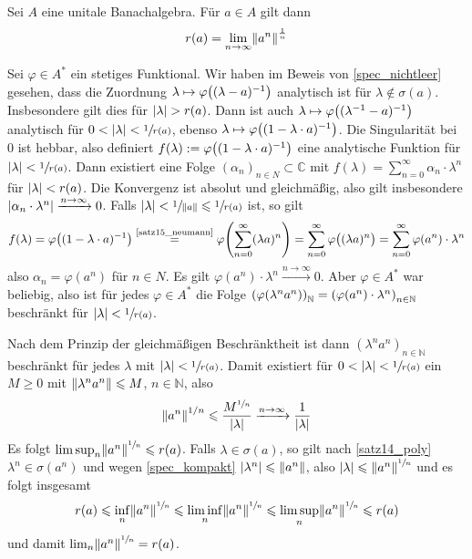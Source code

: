 \begin{satz}
	Sei $A$ eine unitale Banachalgebra. Für $a \in A$ gilt dann 
	\[
		r(a)=\lim_{n \to \infty}\norm{a^n}^{\frac{1}{n}}
	\]
\end{satz}
\begin{beweis}
	Sei $\varphi \in A^*$ ein stetiges Funktional. Wir haben im Beweis von \autoref{spec_nichtleer} gesehen, dass die Zuordnung 
	$\lambda \mapsto \varphi \enbrace*{(\lambda-a)^{-1}}$ analytisch ist für $\lambda \notin \sigma(a)$. Insbesondere gilt dies für $\abs{\lambda}> r(a)$. Dann ist auch
	$\lambda \mapsto \varphi \enbrace*{(\lambda^{-1}-a)^{-1}}$ analytisch für $0< \abs{\lambda}< \sfrac{1}{r(a)}$, ebenso 
	$\lambda \mapsto \varphi \enbrace*{(1- \lambda \cdot a)^{-1}}$. Die Singularität bei $0$ ist hebbar, also definiert $f(\lambda) := \varphi \enbrace*{(1-\lambda \cdot a)^{-1}}$
	eine analytische Funktion für $\abs{\lambda} < \sfrac{1}{r(a)}$. Dann existiert eine Folge $(\alpha_n)_{n \in N} \subset \mathds{C}$ mit 
	$f(\lambda) = \sum_{n=0}^{\infty} \alpha_n \cdot \lambda^n$ für $\abs{\lambda}<r(a)$. Die Konvergenz ist absolut und gleichmäßig, also gilt insbesondere 
	$\abs{\alpha_n \cdot \lambda^n} \xrightarrow{n \to \infty}0$. Falls $\abs{\lambda} < \sfrac{1}{\norm{a}} \le \sfrac{1}{r(a)}$ 
	ist, so gilt
	\[
		f(\lambda) = \varphi \enbrace*{(1- \lambda \cdot a)^{-1}} \stackrel{\mbox{\scriptsize\ref{satz15_neumann}}}{=} \varphi \enbrace*{\sum_{n=0}^{\infty} (\lambda a)^n} = 
		\sum_{n=0}^{\infty} \varphi \enbrace[\big]{(\lambda a)^n} = \sum_{n=0}^{\infty} \varphi(a^n) \cdot \lambda^n
	\]
	also $\alpha_n = \varphi(a^n)$ für $n \in N$. Es gilt $\varphi(a^n) \cdot \lambda^n \xrightarrow{n \to \infty} 0$. Aber $\varphi \in A^*$ war beliebig, also ist für jedes 
	$\varphi \in A^*$ die Folge $\enbrace*{\varphi(\lambda^n a^n)}_\mathds{N} = \enbrace*{\varphi(a^n) \cdot \lambda^n}_{n \in \mathds{N}}$ beschränkt für 
	$\abs{\lambda}<\sfrac{1}{r(a)}$.

	Nach dem Prinzip der gleichmäßigen Beschränktheit ist dann $(\lambda^n a^n)_{n \in \mathds{N}}$ beschränkt für jedes $\lambda$ mit $\abs{\lambda}< \sfrac{1}{r(a)}$. Damit 
	existiert für $0 < \abs{\lambda}< \sfrac{1}{r(a)}$ ein $M \ge 0$ mit $\norm{\lambda^n a^n} \le M$, $n \in \mathds{N}$, also 
	\[
		\norm{a^n}^{1/n}\le\frac{M^{\sfrac{1}{n}}}{\abs{\lambda}} \xrightarrow{n \to \infty} \frac{1}{\abs{\lambda}} 
	\]
	Es folgt $\limsup_n \norm{a^n}^{\sfrac{1}{n}} \le r(a)$. Falls $\lambda \in \sigma(a)$, so gilt nach \autoref{satz14_poly} $\lambda^n \in \sigma(a^n)$ und wegen 
	\autoref{spec_kompakt} $\abs{\lambda^n} \le \norm{a^n}$, also $\abs{\lambda} \le \norm{a^n}^{\sfrac{1}{n}}$ und es folgt insgesamt
	\begin{align}
		r(a) \le \inf_n \norm{a^n}^{\sfrac{1}{n}} \le \liminf_n \norm{a^n}^{\sfrac{1}{n}} \le \limsup_n \norm{a^n}^{\sfrac{1}{n}} \le r(a)
	\end{align}
	und damit $\lim_n \norm{a^n}^{\sfrac{1}{n}} = r(a)$.
\end{beweis}

